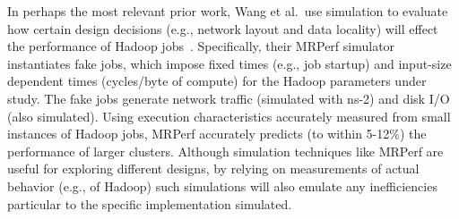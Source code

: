 In perhaps the most relevant prior work, Wang et al.\ use simulation
to evaluate how certain design decisions (e.g., network layout and data
locality) will effect the performance of Hadoop
jobs~\cite{mr-simulation}.  Specifically, their MRPerf simulator
instantiates fake jobs, which impose fixed times (e.g., job startup)
and input-size dependent times (cycles/byte of compute) for the Hadoop
parameters under study. The fake jobs generate network traffic
(simulated with ns-2) and disk I/O (also simulated).  Using execution
characteristics accurately measured from small instances of Hadoop
jobs, MRPerf accurately predicts (to within 5-12\%) the performance
of larger clusters.  Although simulation techniques like MRPerf are
useful for exploring different designs, by relying on measurements of
actual behavior (e.g., of Hadoop) such simulations will also emulate any
inefficiencies particular to the specific implementation simulated.








